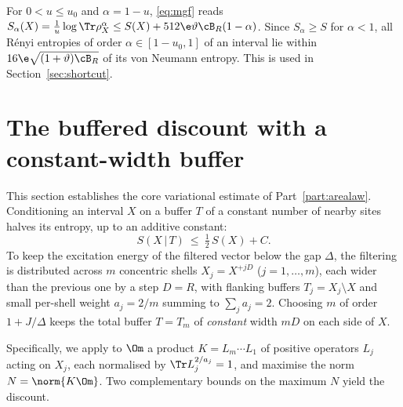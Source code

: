 \begin{remark}\label{rem:renyi}
For $0<u\le u_0$ and $\alpha=1-u$, \eqref{eq:mgf} reads
$S_\alpha(X)=\frac{1}{u}\log\Tr\rho_X^{\alpha}\le S(X)+512\e\vartheta\cB_R(1-\alpha)$.
Since $S_\alpha\ge S$ for $\alpha<1$, all Rényi entropies of order
$\alpha\in[1-u_0,1]$ of an interval lie within $16\e\sqrt{(1+\vartheta)\cB_R}$ of its von
Neumann entropy. This is used in Section~\ref{sec:shortcut}.
\end{remark}

\section{The buffered discount with a constant-width buffer}\label{sec:buffer}

\begin{inwords}
This section establishes the core variational estimate of Part~\ref{part:arealaw}.
Conditioning an interval $X$ on a buffer $T$ of a constant number of
nearby sites halves its entropy, up to an additive constant:
\[
 S(X\,|\,T)\ \le\ \tfrac12\,S(X)+C .
\]
To keep the excitation energy of the filtered vector below the gap
$\Delta$, the filtering is distributed across $m$ concentric shells
$X_j=X^{+jD}$ ($j=1,\dots,m$), each wider than the previous one by a step $D=R$, with flanking buffers
$T_j=X_j\setminus X$ and small per-shell weight $a_j=2/m$ summing to
$\sum_j a_j=2$. Choosing $m$ of order $1+J/\Delta$ keeps the total buffer
$T=T_m$ of \emph{constant} width $mD$ on each side of $X$.

Specifically, we apply to $\Om$ a product $K=L_m\cdots L_1$ of positive
operators $L_j$ acting on $X_j$, each normalised by $\Tr L_j^{2/a_j}=1$,
and maximise the norm $N=\norm{K\Om}$. Two complementary bounds on the
maximum $N$ yield the discount.


\end{inwords}
